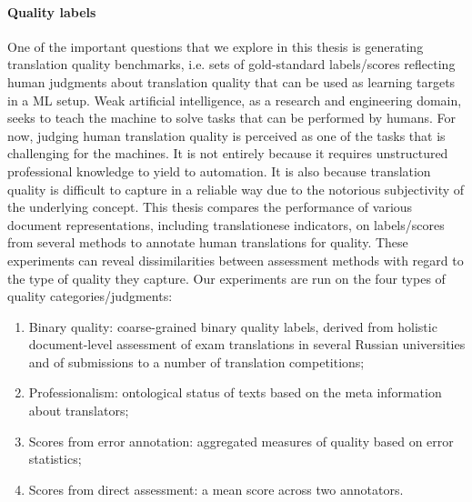 \paragraph{Quality labels} One of the important questions that we explore in this thesis is generating translation quality benchmarks, i.e. sets of gold-standard labels/scores reflecting human judgments about translation quality that can be used as learning targets in a ML setup. 
Weak artificial intelligence, as a research and engineering domain, seeks to teach the machine to solve tasks that can be performed by humans. 
For now, judging human translation quality is perceived as one of the tasks that is challenging for the machines. It is not entirely because it requires unstructured professional knowledge to yield to automation. It is also because translation quality is difficult to capture in a reliable way due to the notorious subjectivity of the underlying concept. This thesis compares the performance of various document representations, including translationese indicators, on labels/scores from several methods to annotate human translations for quality. These experiments can reveal dissimilarities between assessment methods with regard to the type of quality they capture. 
Our experiments are run on the four types of quality categories/judgments:
\begin{enumerate}\compresslist{}
	\item Binary quality: coarse-grained binary quality labels, derived from holistic document-level assessment of exam translations in several Russian universities and of submissions to a number of translation competitions;
	\item Professionalism: ontological status of texts based on the meta information about translators;
	\item Scores from error annotation: aggregated measures of quality based on error statistics;
	\item Scores from direct assessment: a mean score across two annotators.
\end{enumerate}

